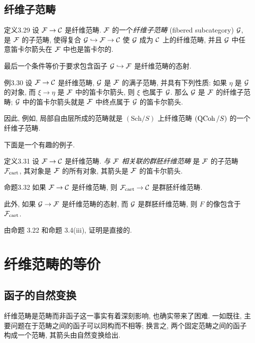 \subsection{纤维子范畴}
\begin{origstatement}{定义}{3.29}\label{ch03:def329}
设 $\mathcal F\to\mathcal C$ 是纤维范畴. $\mathcal F$ 的一个\emph{纤维子范畴} (fibered subcategory) $\mathcal G$, 是 $\mathcal F$ 的子范畴, 使得复合 $\mathcal G\hookrightarrow\mathcal F\to\mathcal C$ 使 $\mathcal G$ 成为 $\mathcal C$ 上的纤维范畴, 并且 $\mathcal G$ 中任意笛卡尔箭头在 $\mathcal F$ 中也是笛卡尔的.
\end{origstatement}

最后一个条件等价于要求包含函子 $\mathcal G\hookrightarrow\mathcal F$ 是纤维范畴的态射.

\begin{origstatement}{例}{3.30}\label{ch03:ex330}
设 $\mathcal F\to\mathcal C$ 是纤维范畴, $\mathcal G$ 是 $\mathcal F$ 的满子范畴, 并具有下列性质: 如果 $\eta$ 是 $\mathcal G$ 的对象, 而 $\xi\to\eta$ 是 $\mathcal F$ 中的笛卡尔箭头, 则 $\xi$ 也属于 $\mathcal G$. 那么 $\mathcal G$ 是 $\mathcal F$ 的纤维子范畴; $\mathcal G$ 中的笛卡尔箭头就是 $\mathcal F$ 中终点属于 $\mathcal G$ 的笛卡尔箭头.
\end{origstatement}

因此, 例如, 局部自由层所成的范畴就是 $(\mathrm{Sch}/S)$ 上纤维范畴 $(\operatorname{QCoh}/S)$ 的一个纤维子范畴.

下面是一个有趣的例子.

\begin{origstatement}{定义}{3.31}\label{ch03:def331}
设 $\mathcal F\to\mathcal C$ 是纤维范畴. \emph{与 $\mathcal F$ 相关联的群胚纤维范畴} 是 $\mathcal F$ 的子范畴 $\mathcal F_{\mathrm{cart}}$, 其对象是 $\mathcal F$ 的所有对象, 其箭头是 $\mathcal F$ 的笛卡尔箭头.
\end{origstatement}

\begin{origstatement}{命题}{3.32}\label{ch03:prop332}
如果 $\mathcal F\to\mathcal C$ 是纤维范畴, 则 $\mathcal F_{\mathrm{cart}}\to\mathcal C$ 是群胚纤维范畴.

此外, 如果 $\mathcal G\to\mathcal F$ 是纤维范畴的态射, 而 $\mathcal G$ 是群胚纤维范畴, 则 $F$ 的像包含于 $\mathcal F_{\mathrm{cart}}$.
\end{origstatement}

由命题 3.22 和命题 3.4(iii), 证明是直接的.

\section{纤维范畴的等价}
\label{ch03:sec35}
\subsection{函子的自然变换}
纤维范畴是范畴而非函子这一事实有着深刻影响, 也确实带来了困难. 一如既往, 主要问题在于范畴之间的函子可以同构而不相等; 换言之, 两个固定范畴之间的函子构成一个范畴, 其箭头由自然变换给出.

